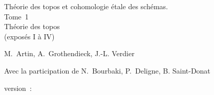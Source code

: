 \documentclass[12pt]{../fichiers-configuration-latex/amsbook}
\begin{document}
\begin{center}
{\Large Théorie des topos et cohomologie étale des schémas.\\
Tome 1\\
Théorie des topos\\
(exposés I à IV)}
\end{center}

\vskip1cm
\begin{center}
M. Artin, A. Grothendieck, J.-L. Verdier
\end{center}

\vskip1cm
\begin{center}
Avec la participation de N. Bourbaki, P. Deligne, B. Saint-Donat
\end{center}

version : \showgitstatus{}
\tableofcontents

\mainmatter

\def\danslelivre{1}

\def\thechapter{\Roman{chapter}}

\def\chaptername{Exposé}






\backmatter
\end{document}
